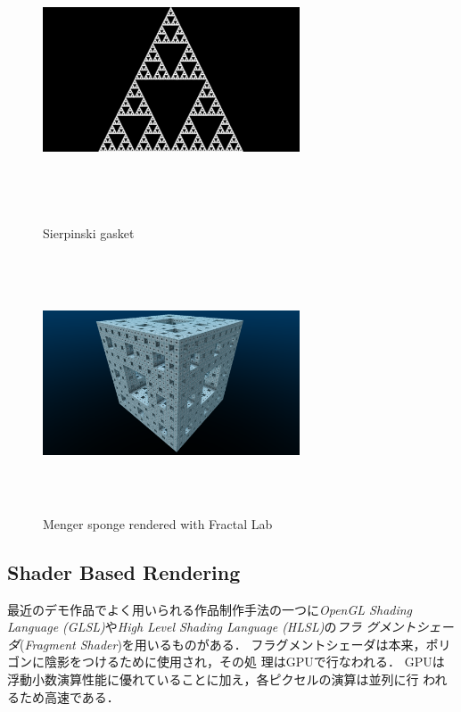 \begin{figure}[htbp]
 \begin{minipage}{0.5\hsize}
   \center
  \includegraphics[width=3in, height=3in, keepaspectratio]{../img/fractal/gasket.pdf}
  \caption{Sierpinski gasket}
  \label{fig:gasket}
 \end{minipage}
 \begin{minipage}{0.5\hsize}
  \center
  \includegraphics[width=3in, height=3in, keepaspectratio]{../img/fractal/menger.pdf}
  \caption{Menger sponge rendered with Fractal Lab}
  \label{fig:menger}
 \end{minipage}

\end{figure}

\subsection{Shader Based Rendering}

最近のデモ作品でよく用いられる作品制作手法の一つに\textit{OpenGL Shading
Language (GLSL)}や\textit{High Level Shading Language (HLSL)}の\emph{フラ
グメントシェーダ}(\textit{Fragment Shader})を用いるものがある．
フラグメントシェーダは本来，ポリゴンに陰影をつけるために使用され，その処
理はGPUで行なわれる．
GPUは浮動小数演算性能に優れていることに加え，各ピクセルの演算は並列に行
われるため高速である．

